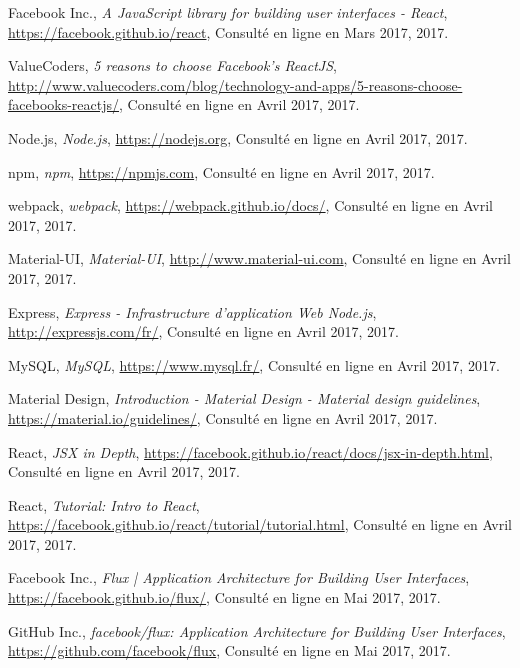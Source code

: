 \begin{thebibliography}{9}

  Facebook Inc.,
  \emph{A JavaScript library for building user interfaces - React},
  \url{https://facebook.github.io/react},
  Consulté en ligne en Mars 2017,
  2017.

  ValueCoders,
  \emph{5 reasons to choose Facebook’s ReactJS},
  \url{http://www.valuecoders.com/blog/technology-and-apps/5-reasons-choose-facebooks-reactjs/},
  Consulté en ligne en Avril 2017,
  2017.

  Node.js,
  \emph{Node.js},
  \url{https://nodejs.org},
  Consulté en ligne en Avril 2017,
  2017.

  npm,
  \emph{npm},
  \url{https://npmjs.com},
  Consulté en ligne en Avril 2017,
  2017.

  webpack,
  \emph{webpack},
  \url{https://webpack.github.io/docs/},
  Consulté en ligne en Avril 2017,
  2017.

  Material-UI,
  \emph{Material-UI},
  \url{http://www.material-ui.com},
  Consulté en ligne en Avril 2017,
  2017.

  Express,
  \emph{Express - Infrastructure d'application Web Node.js},
  \url{http://expressjs.com/fr/},
  Consulté en ligne en Avril 2017,
  2017.

  MySQL,
  \emph{MySQL},
  \url{https://www.mysql.fr/},
  Consulté en ligne en Avril 2017,
  2017.

  Material Design,
  \emph{Introduction - Material Design - Material design guidelines},
  \url{https://material.io/guidelines/},
  Consulté en ligne en Avril 2017,
  2017.

  React,
  \emph{JSX in Depth},
  \url{https://facebook.github.io/react/docs/jsx-in-depth.html},
  Consulté en ligne en Avril 2017,
  2017.

  React,
  \emph{Tutorial: Intro to React},
  \url{https://facebook.github.io/react/tutorial/tutorial.html},
  Consulté en ligne en Avril 2017,
  2017.

  Facebook Inc.,
  \emph{Flux | Application Architecture for Building User Interfaces},
  \url{https://facebook.github.io/flux/},
  Consulté en ligne en Mai 2017,
  2017.

  GitHub Inc.,
  \emph{facebook/flux: Application Architecture for Building User Interfaces},
  \url{https://github.com/facebook/flux},
  Consulté en ligne en Mai 2017,
  2017.


\end{thebibliography}
